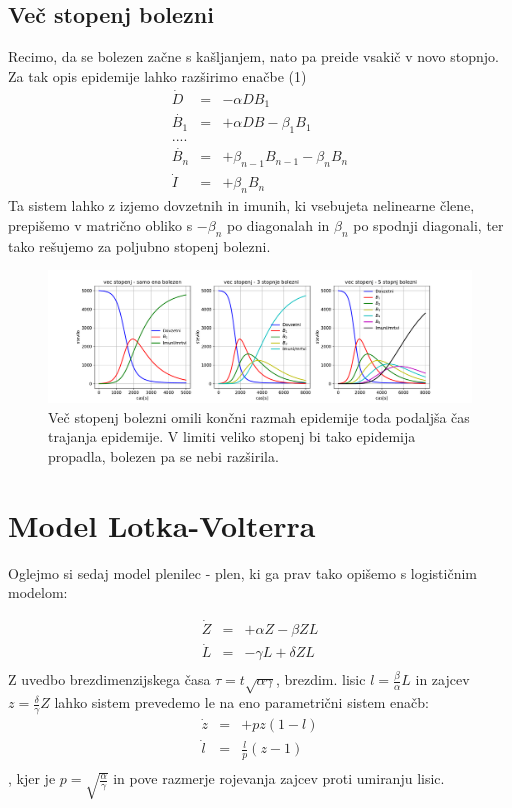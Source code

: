 \documentclass[11pt, a4paper]{article}
\begin{document}
\subsection{Več stopenj bolezni}
Recimo, da se bolezen začne s kašljanjem, nato pa preide vsakič v novo stopnjo. Za tak opis epidemije lahko razširimo enačbe (1)
\begin{equation}
\begin{array} {lcl} \dot{D} & = & -\alpha DB_1 \\
\dot{B_1}  & = & +\alpha DB - \beta_1 B_1   \\
....\\
\dot{B_n}  & = & +\beta_{n-1} B_{n-1}  - \beta_n B_n   \\
\dot{I}  & = & +\beta_n B_n \end{array}
\end{equation}
Ta sistem lahko z izjemo dovzetnih in imunih, ki vsebujeta nelinearne člene, prepišemo v matrično obliko s $-\beta_n$ po diagonalah in $\beta_n$ po spodnji diagonali, ter tako rešujemo za poljubno stopenj bolezni.
\begin{figure}[htb!]
\hspace*{-2.5cm}
  \centering
  \includegraphics[width=22cm]{stopnjevanje_bolezni.pdf}
  \caption{Več stopenj bolezni omili končni razmah epidemije toda podaljša čas trajanja epidemije. V limiti veliko stopenj bi tako epidemija propadla, bolezen pa se nebi razširila.}
\end{figure}

\section{Model Lotka-Volterra}
Oglejmo si sedaj model plenilec - plen, ki ga prav tako opišemo s logističnim modelom:


\begin{equation}
\begin{array} {lcl} \dot{Z} & = & +\alpha Z - \beta ZL \\
\dot{L}  & = &  -\gamma L + \delta ZL   \\
 \end{array}
\end{equation}
Z uvedbo brezdimenzijskega časa $\tau = t \sqrt{\alpha \gamma}$, brezdim. lisic $l = \frac{\beta}{\alpha}L$ in zajcev $z = \frac{\delta}{\gamma} Z$ lahko sistem prevedemo le na eno parametrični sistem enačb: 
\begin{equation}
\begin{array} {lcl} \dot{z} & = & +p z(1-l) \\
\dot{l}  & = & \frac{l}{p}(z-1)\\
 \end{array}
\end{equation}
, kjer je $p = \sqrt{\frac{\alpha}{\gamma}}$ in pove razmerje rojevanja zajcev proti umiranju lisic.
\end{document}
